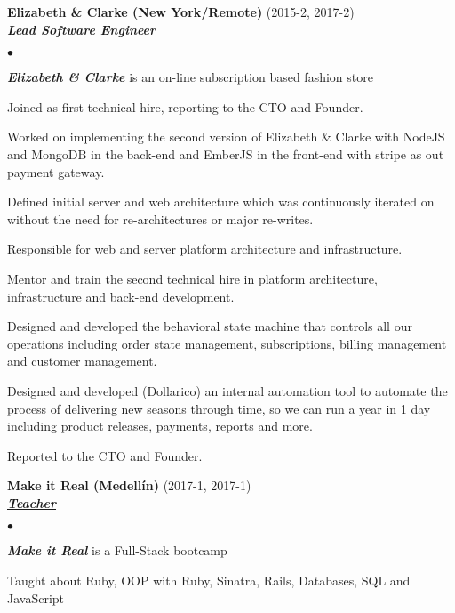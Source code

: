 \documentclass[a4paper]{article}
\newcommand{\employer}[3]{{
  \textbf{#1} (#2)\\ \underline{\textbf{\emph{#3}}}\\ }}
\newenvironment{achievements}{\begin{list}{$\bullet$}{\topsep 0pt \itemsep
  -2pt}}{\vspace*{4pt}\end{list}}
\newcommand{\emphasys}[1]{\textbf{\emph{#1}}}
\begin{document}
  \employer{ Elizabeth \& Clarke (New York/Remote)}{2015-2, 2017-2}{Lead Software Engineer}
  \begin{achievements}
  \item \emphasys{Elizabeth \& Clarke} is an on-line subscription based fashion store
  \item Joined as first technical hire, reporting to the CTO and Founder.
  \item Worked on implementing the second version of Elizabeth \& Clarke with NodeJS and MongoDB in the back-end and EmberJS in the front-end with stripe as out payment gateway.
  \item Defined initial server and web architecture which was continuously iterated on without the need for re-architectures or major re-writes.
  \item Responsible for web and server platform architecture and infrastructure.
  \item Mentor and train the second technical hire in platform architecture, infrastructure and back-end development.
  \item Designed and developed the behavioral state machine that controls all our operations including order state management, subscriptions, billing management and customer management.
  \item Designed and developed (Dollarico) an internal automation tool to automate the process of delivering new seasons through time, so we can run a year in 1 day including product releases, payments, reports and more.
  \item Reported to the CTO and Founder.
  \end{achievements}

  \employer{Make it Real (Medell\'in)}{2017-1, 2017-1}{Teacher}
  \begin{achievements}
  \item \emphasys{Make it Real} is a Full-Stack bootcamp
  \item Taught about Ruby, OOP with Ruby, Sinatra, Rails, Databases, SQL and JavaScript
  \end{achievements}
\end{document}
